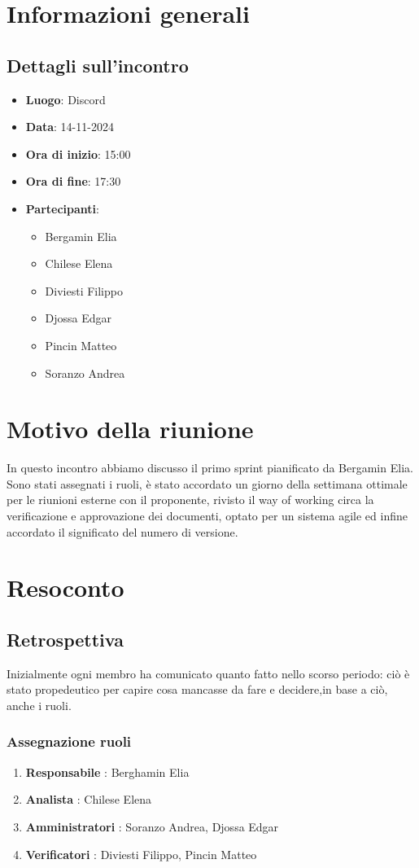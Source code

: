 \section{Informazioni generali}
\subsection{Dettagli sull'incontro}
\begin{itemize}
    \item \textbf{Luogo}: Discord
    \item \textbf{Data}: 14-11-2024
    \item \textbf{Ora di inizio}: 15:00
    \item \textbf{Ora di fine}: 17:30
    \item \textbf{Partecipanti}: 
    \begin{itemize}
        \item Bergamin Elia
        \item Chilese Elena
        \item Diviesti Filippo
        \item Djossa Edgar
        \item Pincin Matteo 
        \item Soranzo Andrea  
    \end{itemize}
\end{itemize}

\section{Motivo della riunione}
In questo incontro abbiamo discusso il primo sprint pianificato da Bergamin Elia. Sono stati assegnati i ruoli, è stato accordato un giorno della settimana ottimale per le riunioni
esterne con il proponente, rivisto il way of working circa la verificazione e approvazione dei documenti, optato per un sistema agile ed infine accordato il significato
del numero di versione.
\section{Resoconto}
\subsection{Retrospettiva}
Inizialmente ogni membro ha comunicato quanto fatto nello scorso periodo: ciò è stato propedeutico per capire cosa mancasse da fare e decidere,in base a ciò, anche i ruoli.
    \subsubsection{Assegnazione ruoli}
    \begin{enumerate}
        \item \textbf{Responsabile} : Berghamin Elia
        \item \textbf{Analista} : Chilese Elena
        \item \textbf{Amministratori} : Soranzo Andrea, Djossa Edgar
        \item \textbf{Verificatori} : Diviesti Filippo, Pincin Matteo
    \end{enumerate}

